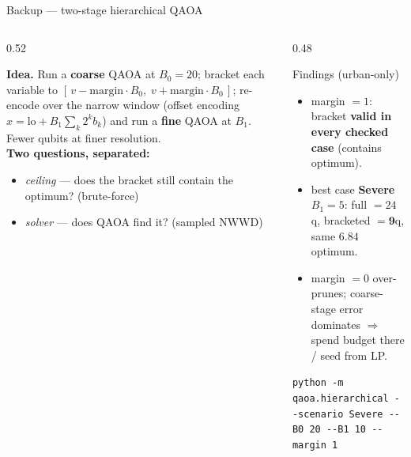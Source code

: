 \documentclass[aspectratio=169,10pt]{beamer}
\newcommand{\NWWD}{\ensuremath{\mathrm{NWWD}}}
\newcommand{\hlt}[1]{{\color{cyan}\bfseries #1}}
\newcommand{\keyword}[1]{{\color{amber}\bfseries #1}}
\begin{document}
\begin{frame}{Backup — two-stage hierarchical QAOA}
\begin{columns}[T]
\begin{column}{0.52\textwidth}
{\footnotesize
\textbf{Idea.} Run a \hlt{coarse} QAOA at $B_0{=}20$; bracket each variable to
$[\,v-\text{margin}\cdot B_0,\; v+\text{margin}\cdot B_0\,]$; re-encode over the
narrow window (offset encoding $x=\text{lo}+B_1\sum_k 2^k b_k$) and run a
\hlt{fine} QAOA at $B_1$. Fewer qubits at finer resolution.\\[6pt]

\textbf{Two questions, separated:}
\begin{itemize}\setlength\itemsep{2pt}
\item[(A)] \emph{ceiling} — does the bracket still contain the optimum? (brute-force)
\item[(B)] \emph{solver} — does QAOA find it? (sampled \NWWD)
\end{itemize}}
\end{column}
\begin{column}{0.48\textwidth}
\begin{block}{Findings (urban-only)}
{\footnotesize
\begin{itemize}\setlength\itemsep{2pt}
\item margin $=1$: bracket \hlt{valid in every checked case} (contains optimum).
\item best case \keyword{Severe $B_1{=}5$}: full $=24$q, bracketed $=\mathbf{9}$q, same $6.84$ optimum.
\item margin $=0$ over-prunes; coarse-stage error dominates $\Rightarrow$ spend budget there / seed from LP.
\end{itemize}}
\end{block}
\vspace{1pt}
{\scriptsize\color{greytx}\texttt{python -m qaoa.hierarchical -{}-scenario Severe -{}-B0 20 -{}-B1 10 -{}-margin 1}}
\end{column}
\end{columns}
\end{frame}
\end{document}
